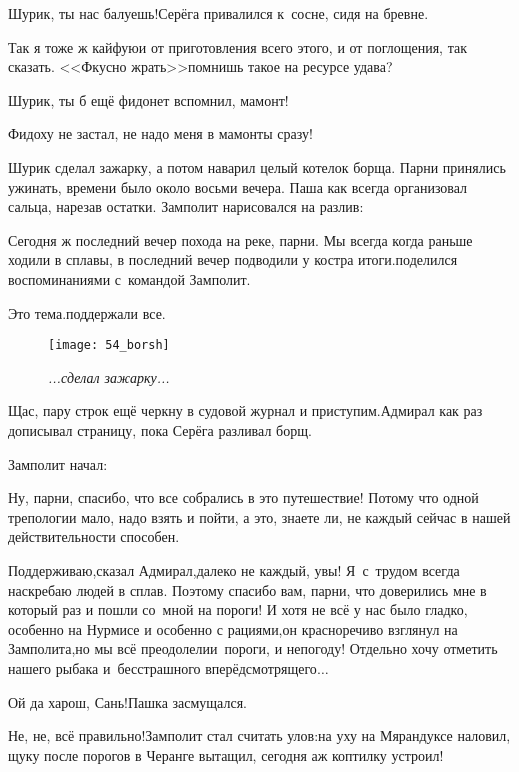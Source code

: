 \diagdash Шурик, ты нас балуешь!\mdash Серёга привалился к~сосне, сидя на бревне.

\diagdash Так я тоже ж кайфую\mdash и от приготовления всего этого, и от поглощения, так сказать. <<Фкусно жрать>>\mdash помнишь такое на ресурсе удава?

\diagdash Шурик, ты б ещё фидонет вспомнил, мамонт!

\diagdash Фидоху не застал, не надо меня в мамонты сразу!

Шурик сделал зажарку, а потом наварил целый котелок борща. Парни принялись ужинать, времени было около восьми вечера. Паша как всегда организовал сальца, нарезав остатки. Замполит нарисовался на разлив:

\diagdash Сегодня ж последний вечер похода на реке, парни. Мы всегда когда раньше ходили в сплавы, в последний вечер подводили у костра итоги.\mdash поделился воспоминаниями с~командой Замполит.

\diagdash Это тема.\mdash поддержали все.

\begin{wrapfigure}[18]{l}{0.50\textwidth}
	\centering
	\texttt{[image: 54\_borsh]}
	\caption{\small\textit{...сделал зажарку...}}
\end{wrapfigure}
\mdash Щас, пару строк ещё черкну в судовой журнал и приступим.\mdash Адмирал как раз дописывал страницу, пока Серёга разливал борщ.

Замполит начал:

\diagdash Ну, парни, спасибо, что все собрались в это путешествие! Потому что одной трепологии мало, надо взять и пойти, а это, знаете ли, не каждый сейчас в нашей действительности способен. %

\diagdash Поддерживаю,\mdash сказал Адмирал,\mdash далеко не каждый, увы! Я~с~трудом всегда наскребаю людей в сплав. Поэтому спасибо вам, парни, что доверились мне в который раз и пошли со~мной на пороги! И хотя не всё у нас было гладко, особенно на Нурмисе и особенно с рациями,\mdash он красноречиво взглянул на Замполита,\mdash но мы всё преодолели\mdash и~пороги, и непогоду! Отдельно хочу отметить нашего рыбака и~бесстрашного вперёдсмотрящего$\ldots$

\diagdash Ой да харош, Сань!\mdash Пашка засмущался.

\diagdash Не, не, всё правильно!\mdash Замполит стал считать улов:\mdash на уху на Мярандуксе наловил, щуку после порогов в Черанге вытащил, сегодня аж коптилку устроил!

